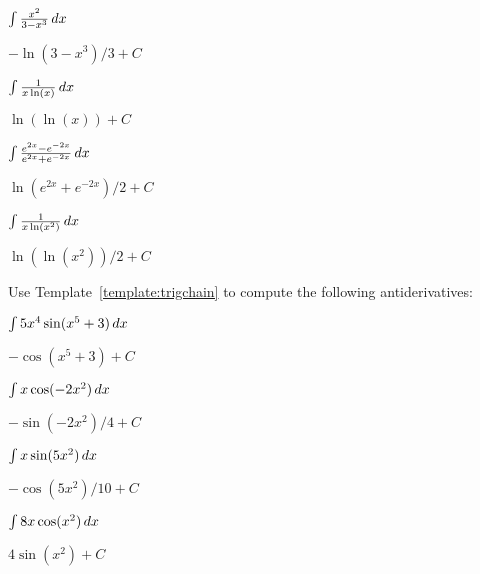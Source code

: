 \begin{exercises}
\begin{multicols}{2}
\begin{exercise}
$\int \frac{x^2}{3-x^3} \, d x$  
\begin{answer}
$-\ln(3-x^3)/3+C$
\end{answer}
\end{exercise}

\begin{exercise}
$\int \frac{1}{x\ln(x)} \, d x$ 
\begin{answer}
$\ln(\ln(x))+C$
\end{answer}
\end{exercise}

\begin{exercise}
$\int \frac{e^{2x}-e^{-2x}}{e^{2x}+e^{-2x}} \, d x$ 
\begin{answer}
$\ln(e^{2x}+e^{-2x})/2 +C$
\end{answer}
\end{exercise}
\end{multicols}

\begin{exercise}
$\int \frac{1}{x\ln(x^2)} \, d x$ 
\begin{answer}
$\ln(\ln(x^2))/2 + C$
\end{answer}
\end{exercise}


\noindent Use Template~\ref{template:trigchain} to compute the
following antiderivatives:


\begin{multicols}{2}
\begin{exercise}
$\int 5x^4 \sin(x^5+3) \, d x$ 
\begin{answer}
$-\cos(x^5+3) +C$
\end{answer}
\end{exercise}

\begin{exercise}
$\int x \cos(-2x^2) \, d x$
\begin{answer}
$-\sin(-2x^2)/4 +C$
\end{answer}
\end{exercise}

\begin{exercise}
$\int x \sin(5x^2) \, d x$
\begin{answer}
$-\cos(5x^2)/10 +C$
\end{answer}
\end{exercise}

\begin{exercise}
$\int 8x\cos(x^2)\, d x$       
\begin{answer}
$4\sin(x^2)+C$
\end{answer}
\end{exercise}


\end{multicols}
\end{exercises}
